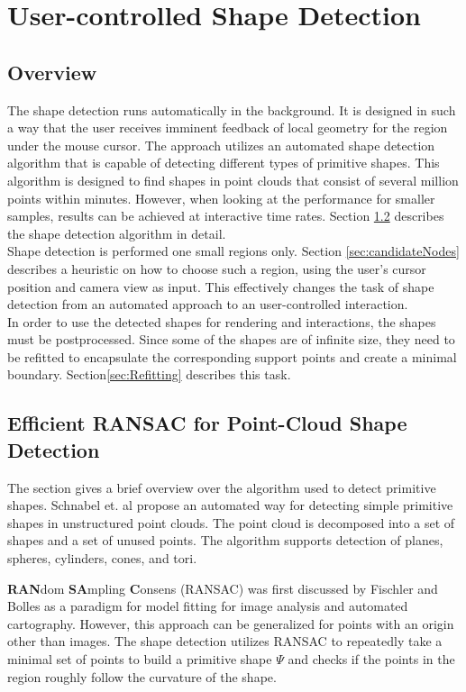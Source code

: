\chapter{User-controlled Shape Detection}
\newpage
\section{Overview}
The shape detection runs automatically in the background. It is designed in such a way that the user receives imminent feedback of local geometry for the region under the mouse cursor. The approach utilizes an automated shape detection algorithm that is capable of detecting different types of primitive shapes. This algorithm is designed to find shapes in point clouds that consist of several million points within minutes. However, when looking at the performance for smaller samples, results can be achieved at interactive time rates. Section \ref{sec:schnabel} describes the shape detection algorithm in detail. 
\\
Shape detection is performed one small regions only. Section \ref{sec:candidateNodes} describes a heuristic on how to choose such a region, using the user's cursor position and camera view as input. This effectively changes the task of shape detection from an automated approach to an user-controlled interaction.
\\ 
In order to use the detected shapes for rendering and interactions, the shapes must be postprocessed. Since some of the shapes are of infinite size, they need to be refitted to  encapsulate the corresponding support points and create a minimal boundary. Section\ref{sec:Refitting} describes this task. 

\section{Efficient RANSAC for Point-Cloud Shape Detection}
\label{sec:schnabel}
The section gives a brief overview over the algorithm used to detect primitive shapes. 
Schnabel et. al\cite{schnabel-2007-efficient} propose an automated way for detecting simple primitive shapes in unstructured point clouds. The point cloud is decomposed into a set of shapes and a set of unused points. The algorithm supports detection of planes, spheres, cylinders, cones, and tori. 

\textbf{RAN}dom \textbf{SA}mpling \textbf{C}onsens (RANSAC) was first discussed by Fischler and Bolles\cite{fischler1981random} as a paradigm for model fitting for image analysis and automated cartography. However, this approach can be generalized for points with an origin other than images. The shape detection utilizes RANSAC to repeatedly take a minimal set of points to build a primitive shape $\Psi$ and checks if the points in the region roughly follow the curvature of the shape. 


